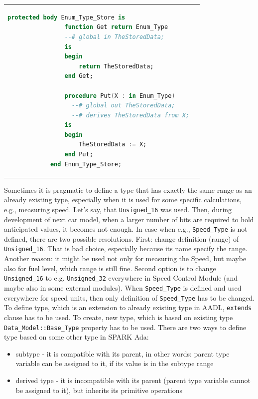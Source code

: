 \begin{center}
\begin{longtable}{| p{3in} | p{3in} |}
\begin{lstlisting}[language=ada]
		    protected body Enum_Type_Store is
		        function Get return Enum_Type
		        --# global in TheStoredData;
		        is
		        begin
		            return TheStoredData;
		        end Get;

		        procedure Put(X : in Enum_Type)
		          --# global out TheStoredData;
		          --# derives TheStoredData from X;
		        is
		        begin
		            TheStoredData := X;
		        end Put;
		    end Enum_Type_Store;
		\end{lstlisting} 
			
	\end{longtable}
\end{center}
\doublespacing

Sometimes it is pragmatic to define a type that has exactly the same range as an already existing type, especially when it is used for some specific calculations, e.g., measuring speed. Let's say, that \lstinline{Unsigned_16} was used. Then, during development of next car model, when a larger number of bits are required to hold anticipated values, it becomes not enough. In case when e.g., \lstinline{Speed_Type} is not defined, there are two possible resolutions. First: change definition (range) of \lstinline{Unsigned_16}. That is bad choice, especially because its name specify the range. Another reason: it might be used not only for measuring the Speed, but maybe also for fuel level, which range is still fine. Second option is to change \lstinline{Unsigned_16} to e.g. \lstinline{Unsigned_32} everywhere in Speed Control Module (and maybe also in some external modules). When \lstinline{Speed_Type} is defined and used everywhere for speed units, then only definition of \lstinline{Speed_Type} has to be changed. To define type, which is an extension to already existing type in AADL, \lstinline{extends} clause has to be used. To create, new type, which is based on existing type \lstinline{Data_Model::Base_Type} property has to be used. There are two ways to define type based on some other type in SPARK Ada:

\begin{itemize}
	\item subtype - it is compatible with its parent, in other words: parent type variable can be assigned to it, if its value is in the subtype range
	\item derived type - it is incompatible with its parent (parent type variable cannot be assigned to it), but inherits its primitive operations
\end{itemize}

